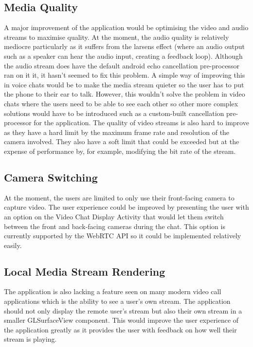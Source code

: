 \documentclass[]{report}
\begin{document}
			\subsection{Media Quality}
			A major improvement of the application would be optimising the video and audio streams to maximise quality. At the moment, the audio quality is relatively mediocre particularly as it suffers from the larsens effect (where an audio output such as a speaker can hear the audio input, creating a feedback loop). Although the audio stream does have the default android echo cancellation pre-processor ran on it it, it hasn't seemed to fix this problem.  A simple way of improving this in voice chats would be to make the media stream quieter so the user has to put the phone to their ear to talk. However, this wouldn't solve the problem in video chats where the users need to be able to see each other so other more complex solutions would have to be introduced such as a custom-built cancellation pre-processor for the application. The quality of video streams is also hard to improve as they have a hard limit by the maximum frame rate and resolution of the camera involved. They also have a soft limit that could be exceeded but at the expense of performance by, for example, modifying the bit rate of the stream.
			
			\subsection{Camera Switching}
			At the moment, the users are limited to only use their front-facing camera to capture video. The user experience could be improved by presenting the user with an option on the Video Chat Display Activity that would let them switch between the front and back-facing cameras during the chat. This option is currently supported by the WebRTC API so it could be implemented relatively easily.
			
			\subsection{Local Media Stream Rendering}
			The application is also lacking a feature seen on many modern video call applications which is the ability to see a user's own stream. The application should not only display the remote user's stream but also their own stream in a smaller GLSurfaceView component. This would improve the user experience of the application greatly as it provides the user with feedback on how well their stream is playing.
			
\end{document}
